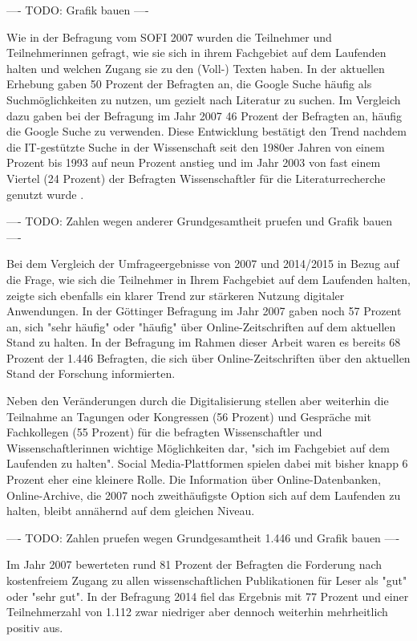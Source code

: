 ---- TODO: Grafik bauen ----

Wie in der Befragung vom SOFI 2007 wurden die Teilnehmer und Teilnehmerinnen gefragt, wie sie sich in ihrem Fachgebiet auf dem Laufenden halten und welchen Zugang sie zu den (Voll-) Texten haben. In der aktuellen Erhebung gaben 50 Prozent der Befragten an, die Google Suche häufig als Suchmöglichkeiten zu nutzen, um gezielt nach Literatur zu suchen. Im Vergleich dazu gaben bei der Befragung im Jahr 2007 46 Prozent der Befragten an, häufig die Google Suche zu verwenden. Diese Entwicklung bestätigt den Trend nachdem die IT-gestützte Suche in der Wissenschaft seit den 1980er Jahren von einem Prozent bis 1993 auf neun Prozent anstieg und im Jahr 2003 von fast einem Viertel (24 Prozent) der Befragten Wissenschaftler für die Literaturrecherche genutzt wurde \cite{hanekop_2008}.

---- TODO: Zahlen wegen anderer Grundgesamtheit pruefen und Grafik bauen ----

Bei dem Vergleich der Umfrageergebnisse von 2007 und 2014/2015 in Bezug auf die Frage, wie sich die Teilnehmer in Ihrem Fachgebiet auf dem Laufenden halten, zeigte sich ebenfalls ein klarer Trend zur stärkeren Nutzung digitaler Anwendungen. In der Göttinger Befragung im Jahr 2007 gaben noch 57 Prozent an, sich "sehr häufig" oder "häufig" über Online-Zeitschriften auf dem aktuellen Stand zu halten. In der Befragung im Rahmen dieser Arbeit waren es bereits 68 Prozent der 1.446 Befragten, die sich über Online-Zeitschriften über den aktuellen Stand der Forschung informierten.

Neben den Veränderungen durch die Digitalisierung stellen aber weiterhin die Teilnahme an Tagungen oder Kongressen (56 Prozent) und Gespräche mit Fachkollegen (55 Prozent) für die befragten Wissenschaftler und Wissenschaftlerinnen wichtige Möglichkeiten dar, "sich im Fachgebiet auf dem Laufenden zu halten". Social Media-Plattformen spielen dabei mit bisher knapp 6 Prozent eher eine kleinere Rolle. Die Information über Online-Datenbanken, Online-Archive, die 2007 noch zweithäufigste Option sich auf dem Laufenden zu halten, bleibt annähernd auf dem gleichen Niveau.

---- TODO: Zahlen pruefen wegen Grundgesamtheit 1.446 und Grafik bauen ----

Im Jahr 2007 bewerteten rund 81 Prozent der Befragten die Forderung nach kostenfreiem Zugang zu allen wissenschaftlichen Publikationen für Leser als "gut" oder "sehr gut". In der Befragung 2014 fiel das Ergebnis mit 77 Prozent und einer Teilnehmerzahl von 1.112 zwar niedriger aber dennoch weiterhin mehrheitlich positiv aus.

